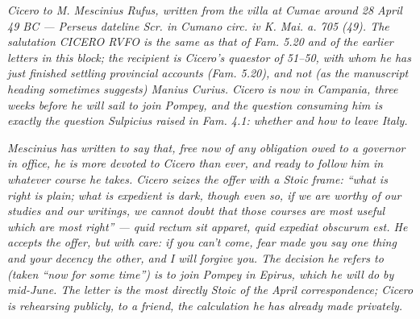 
\textit{Cicero to M. Mescinius Rufus, written from the villa at
Cumae around 28 April 49 BC --- Perseus dateline \textit{Scr.
in Cumano circ. iv K. Mai. a. 705 (49)}. The salutation
\textit{CICERO RVFO} is the same as that of Fam. 5.20 and of
the earlier letters in this block; the recipient is Cicero's
quaestor of 51--50, with whom he has just finished settling
provincial accounts (Fam. 5.20), and not (as the manuscript
heading sometimes suggests) Manius Curius. Cicero is now in
Campania, three weeks before he will sail to join Pompey, and
the question consuming him is exactly the question Sulpicius
raised in Fam. 4.1: whether and how to leave Italy.}

\textit{Mescinius has written to say that, free now of any
obligation owed to a governor in office, he is more devoted to
Cicero than ever, and ready to follow him in whatever course he
takes. Cicero seizes the offer with a Stoic frame: ``what is
right is plain; what is expedient is dark, though even so, if
we are worthy of our studies and our writings, we cannot doubt
that those courses are most useful which are most right'' ---
\textit{quid rectum sit apparet, quid expediat obscurum est}.
He accepts the offer, but with care: if you can't come, fear
made you say one thing and your decency the other, and I will
forgive you. The decision he refers to (taken ``now for some
time'') is to join Pompey in Epirus, which he will do by
mid-June. The letter is the most directly Stoic of the April
correspondence; Cicero is rehearsing publicly, to a friend, the
calculation he has already made privately.}
